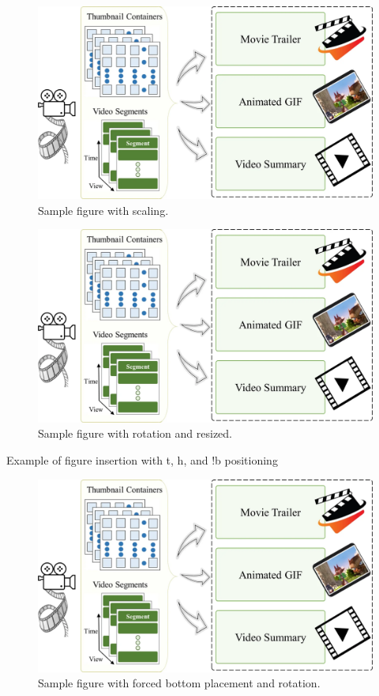 \documentclass[stu,12pt,floatsintext]{apa7}
\begin{document}
\begin{figure}[ht]
    \centering
    \includegraphics[scale=0.3]{figures/sample_img.png}
    \caption{Sample figure with scaling.}
    \label{fig:scaled_sample}
\end{figure}


\begin{figure}[ht]
    \centering
    \includegraphics[angle=90, width=0.5\linewidth]{figures/sample_img.png}
    \caption{Sample figure with rotation and resized.}
    \label{fig:rotated_sample}
\end{figure}


Example of figure insertion with t, h, and !b positioning 

\begin{figure}[!b]
    \centering
    \includegraphics[angle=90, width=0.5\linewidth]{figures/sample_img.png}
    \caption{Sample figure with forced bottom placement and rotation.}
    \label{fig:sample_figre}
\end{figure}
\end{document}
